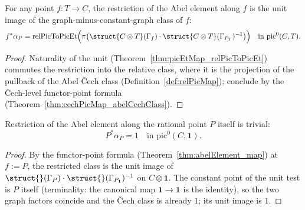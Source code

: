 \begin{theorem}
  \label{thm:abelElement_map}
  \leanok
  For any point \(f \colon T \to C\), the restriction of the Abel element along \(f\) is the
  unit image of the graph-minus-constant-graph class of \(f\):
  \[
    f^{*}\alpha_P = \mathrm{relPicToPicEt}\Bigl(\pi\bigl(
      \struct{C \otimes T}(\Gamma_f)\cdot\struct{C\otimes T}(\Gamma_{P_T})^{-1}\bigr)\Bigr)
    \quad\text{in } \mathrm{pic}^0(C,T).
  \]
\end{theorem}
\begin{proof}
  \leanok
  Naturality of the unit (Theorem~\ref{thm:picEtMap_relPicToPicEt}) commutes the restriction
  into the relative class, where it is the projection of the pullback of the Abel \v Cech
  class (Definition~\ref{def:relPicMap}); conclude by the \v Cech-level functor-point
  formula (Theorem~\ref{thm:cechPicMap_abelCechClass}).
\end{proof}

\begin{theorem}
  \label{thm:abelElement_map_point}
  \leanok
  Restriction of the Abel element along the rational point \(P\) itself is trivial:
  \[
    P^{*} \alpha_P = 1 \quad\text{in } \mathrm{pic}^0(C, \mathbf 1).
  \]
\end{theorem}
\begin{proof}
  \leanok
  By the functor-point formula (Theorem~\ref{thm:abelElement_map}) at \(f := P\), the
  restricted class is the unit image of
  \(\struct{}(\Gamma_P)\cdot\struct{}(\Gamma_{P_{\mathbf 1}})^{-1}\) on
  \(C \otimes \mathbf 1\). The constant point of the unit test is \(P\) itself
  (terminality: the canonical map \(\mathbf 1 \to \mathbf 1\) is the identity), so the two
  graph factors coincide and the \v Cech class is already \(1\); its unit image is \(1\).
\end{proof}
